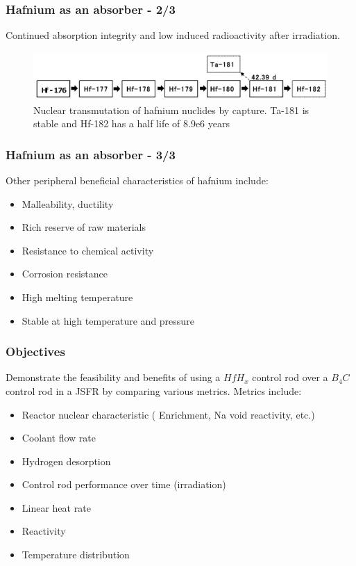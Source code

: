 \documentclass[9pt]{beamer}
\newcommand{\hfh}{$HfH_{x}$\xspace}
\newcommand{\bc}{$B_4C$\xspace}
\begin{document}
\begin{frame}
\frametitle{Hafnium as an absorber - 2/3}
Continued absorption integrity and low induced radioactivity after irradiation.

\begin{figure}[htbp!]
  \begin{center}
      \includegraphics[scale=0.2]{./images/decay_chain.png}
  \end{center}
  \caption{Nuclear transmutation of hafnium nuclides by capture. Ta-181 is stable and Hf-182
            has a half life of 8.9e6 years}
  \label{fig:dec}
\end{figure}
\end{frame}

\begin{frame}
\frametitle{Hafnium as an absorber - 3/3}
Other peripheral beneficial characteristics of hafnium include:
\begin{itemize}
  \item Malleability, ductility
  \item Rich reserve of raw materials
  \item Resistance to chemical activity
  \item Corrosion resistance
  \item High melting temperature
  \item Stable at high temperature and pressure
\end{itemize}
\end{frame}

\begin{frame}
\frametitle{Objectives}
Demonstrate the feasibility and benefits of using a \hfh control rod
over a \bc control rod in a \gls{JSFR} by comparing various metrics.
Metrics include:
\begin{itemize}
    \item Reactor nuclear characteristic ( Enrichment, Na void reactivity, etc.)
    \item Coolant flow rate
    \item Hydrogen desorption
    \item Control rod performance over time (irradiation)
    \item Linear heat rate
    \item Reactivity
    \item Temperature distribution
\end{itemize}
\end{frame}
\end{document}

